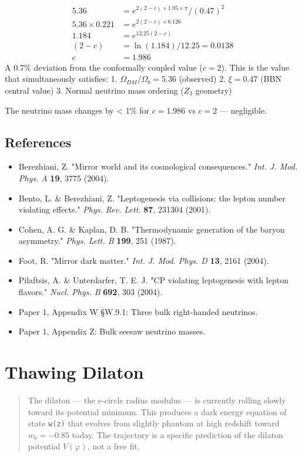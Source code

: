 \documentclass[aps,prd,preprint,superscriptaddress,longbibliography]{revtex4-2}
\begin{document}
\begin{align}
    5.36 &= e^{2(2-c)\times1.95\times\pi} / (0.47)^{2} \\
    5.36 \times 0.221 &= e^{2(2-c)\times6.126} \\
    1.184 &= e^{12.25(2-c)} \\
    (2-c) &= \ln(1.184)/12.25 = 0.0138 \\
    c &= 1.986
\end{align}
A 0.7\% deviation from the conformally coupled value ($c = 2$). This is the value that simultaneously satisfies: 1. $\Omega_{DM}/\Omega_b = 5.36$ (observed) 2. $\xi = 0.47$ (BBN central value) 3. Normal neutrino mass ordering ($Z_{3}$ geometry)

The neutrino mass changes by < 1\% for $c = 1.986$ vs $c = 2$ --- negligible.



\subsection{References}


\begin{itemize}
  \item Berezhiani, Z. "Mirror world and its cosmological consequences." \textit{Int. J. Mod. Phys. A} \textbf{19}, 3775 (2004).
  \item Bento, L. \& Berezhiani, Z. "Leptogenesis via collisions: the lepton number violating effects." \textit{Phys. Rev. Lett.} \textbf{87}, 231304 (2001).
  \item Cohen, A. G. \& Kaplan, D. B. "Thermodynamic generation of the baryon asymmetry." \textit{Phys. Lett. B} \textbf{199}, 251 (1987).
  \item Foot, R. "Mirror dark matter." \textit{Int. J. Mod. Phys. D} \textbf{13}, 2161 (2004).
  \item Pilaftsis, A. \& Unterdarfer, T. E. J. "CP violating leptogenesis with lepton flavors." \textit{Nucl. Phys. B} \textbf{692}, 303 (2004).
  \item Paper 1, Appendix W \S{}W.9.1: Three bulk right-handed neutrinos.
  \item Paper 1, Appendix Z: Bulk seesaw neutrino masses.
\end{itemize}


\section{Thawing Dilaton}


\begin{quote}
The dilaton --- the e-circle radius modulus --- is currently rolling
slowly toward its potential minimum. This produces a dark energy
equation of state \texttt{w(z)} that evolves from slightly phantom at high
redshift toward $w_{0} = -0.85$ today. The trajectory is a specific
prediction of the dilaton potential $V(\varphi)$, not a free fit.
\end{quote}
\end{document}
